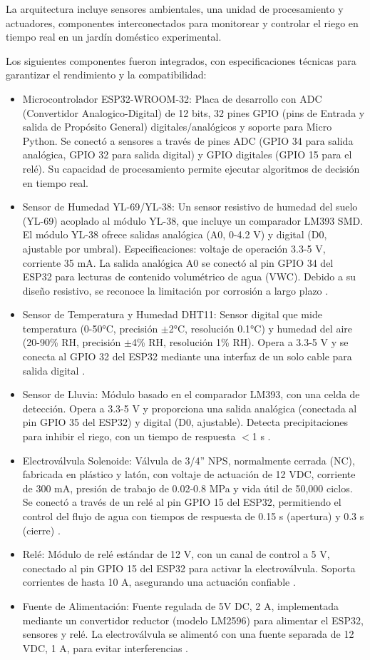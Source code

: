 \documentclass[pdflatex,sn-mathphys-num]{sn-jnl}%
\theoremstyle{thmstyleone}%
\theoremstyle{thmstyletwo}%
\theoremstyle{thmstylethree}%
\begin{document}
\begin{multicols}{2}
La arquitectura incluye sensores ambientales, una unidad de procesamiento y actuadores, componentes interconectados para monitorear y controlar el riego en tiempo real en un jardín doméstico experimental.

Los siguientes componentes fueron integrados, con especificaciones técnicas para garantizar el rendimiento y la compatibilidad:
\begin{itemize}
  \item Microcontrolador ESP32-WROOM-32: Placa de desarrollo con ADC (Convertidor Analogico-Digital) de 12 bits, 32 pines GPIO (pins de Entrada y salida de Propósito General) digitales/analógicos y soporte para Micro Python. Se conectó a sensores a través de pines ADC (GPIO 34 para salida analógica, GPIO 32 para salida digital) y GPIO digitales (GPIO 15 para el relé). Su capacidad de procesamiento permite ejecutar algoritmos de decisión en tiempo real\cite{ref5}.
  \item Sensor de Humedad YL-69/YL-38: Un sensor resistivo de humedad del suelo (YL-69) acoplado al módulo YL-38, que incluye un comparador LM393 SMD. El módulo YL-38 ofrece salidas analógica (A0, 0-4.2 V) y digital (D0, ajustable por umbral). Especificaciones: voltaje de operación 3.3-5 V, corriente 35 mA. La salida analógica A0 se conectó al pin GPIO 34 del ESP32 para lecturas de contenido volumétrico de agua (VWC). Debido a su diseño resistivo, se reconoce la limitación por corrosión a largo plazo \cite{ref6}.
  \item Sensor de Temperatura y Humedad DHT11: Sensor digital que mide temperatura (0-50°C, precisión $\pm$2°C, resolución 0.1°C) y humedad del aire (20-90\% RH, precisión $\pm$4\% RH, resolución 1\% RH). Opera a 3.3-5 V y se conecta al GPIO 32 del ESP32 mediante una interfaz de un solo cable para salida digital \cite{ref7}. 
  \item Sensor de Lluvia: Módulo basado en el comparador LM393, con una celda de detección. Opera a 3.3-5 V y proporciona una salida analógica (conectada al pin GPIO 35 del ESP32) y digital (D0, ajustable). Detecta precipitaciones para inhibir el riego, con un tiempo de respuesta $<$1 s \cite{ref8}.
  \item Electroválvula Solenoide: Válvula de 3/4'' NPS, normalmente cerrada (NC), fabricada en plástico y latón, con voltaje de actuación de 12 VDC, corriente de 300 mA, presión de trabajo de 0.02-0.8 MPa y vida útil de 50,000 ciclos. Se conectó a través de un relé al pin GPIO 15 del ESP32, permitiendo el control del flujo de agua con tiempos de respuesta de 0.15 s (apertura) y 0.3 s (cierre) \cite{ref9}.
  \item Relé: Módulo de relé estándar de 12 V, con un canal de control a 5 V, conectado al pin GPIO 15 del ESP32 para activar la electroválvula. Soporta corrientes de hasta 10 A, asegurando una actuación confiable \cite{ref10}.
  \item Fuente de Alimentación: Fuente regulada de 5V DC, 2 A, implementada mediante un convertidor reductor (modelo LM2596) para alimentar el ESP32, sensores y relé. La electroválvula se alimentó con una fuente separada de 12 VDC, 1 A, para evitar interferencias \cite{ref11}.
\end{itemize}


\end{multicols}
\end{document}
